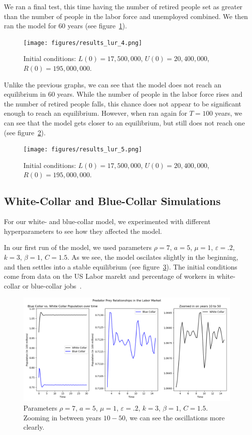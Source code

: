 \documentclass[11pt]{amsart}
\begin{document}
We ran a final test, this time having the number of retired people set as greater than the number of
people in the labor force and unemployed combined. We then ran the model for 60 years (see figure~\ref{fig:results_lur_4}).

\begin{figure}[h]
    \centering
    \texttt{[image: figures/results\_lur\_4.png]}
    \caption{Initial conditions: $L(0) = 17,500,000$, $U(0) = 20,400,000$, $R(0) = 195,000,000$.}
    \label{fig:results_lur_4}
\end{figure}

Unlike the previous graphs, we can see that the model does not reach an equilibrium in 60 years. 
While the number of people in the labor force rises and the number of retired people falls, 
this chance does not appear to be significant enough to reach an equilibrium. However,
when ran again for $T = 100$ years, we can see that the model gets closer to an equilibrium, but 
still does not reach one (see figure~\ref{fig:results_lur_5}).

\begin{figure}[h]
    \centering
    \texttt{[image: figures/results\_lur\_5.png]}
    \caption{Initial conditions: $L(0) = 17,500,000$, $U(0) = 20,400,000$, $R(0) = 195,000,000$.}
    \label{fig:results_lur_5}
\end{figure}

\subsection{White-Collar and Blue-Collar Simulations}

For our white- and blue-collar model, we experimented with different hyperparameters to see how they affected the model. 

In our first run of the model, we used parameters $\rho = 7$, $a = 5$, $\mu = 1$, $\varepsilon = .2$, $k = 3$, $\beta = 1$, $C = 1.5$. As we see, the model oscilates
slightly in the beginning, and then settles into a stable equilibrium (see figure~\ref{fig:results_wb_1}). The initial conditions come from data on the US Labor marekt and percentage of workers in white-collar or blue-collar jobs~\cite{BLS}.

\begin{figure}[h]
    \centering
    \includegraphics[width=.8\textwidth]{figures/blue_vs_white2.png}
    \caption{Parameters $\rho = 7$, $a = 5$, $\mu = 1$, $\varepsilon = .2$, $k = 3$, $\beta = 1$, $C = 1.5$. Zooming in between years $10-50$, we can see the oscillations more clearly.}
    \label{fig:results_wb_1}
\end{figure}
\end{document}
